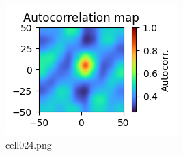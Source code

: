 \begin{figure}[ht]
	\centering
	\includegraphics[scale=0.8, max width=\linewidth]{./fig/appendix/grid-cells-decoding/cell024.png}
	\caption{cell024.png}
	\label{cell024.png}
\end{figure}
